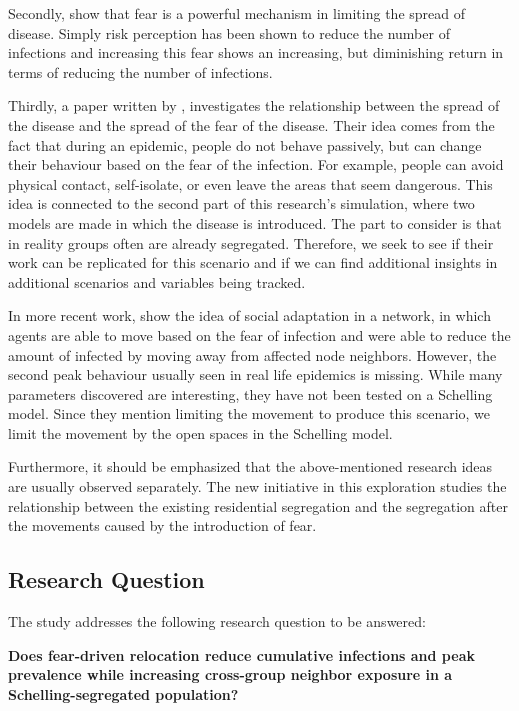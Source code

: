 \documentclass[11pt,a4paper]{article}
\begin{document}
Secondly, \citet{bagnoli2007risk} show that fear is a powerful mechanism in limiting the spread of disease. Simply risk perception has been shown to reduce the number of infections and increasing this fear shows an increasing, but diminishing return in terms of reducing the number of infections.

Thirdly, a paper written by \citet{epstein2008coupled}, investigates the relationship between the spread of the disease and the spread of the fear of the disease. Their idea comes from the fact that during an epidemic, people do not behave passively, but can change their behaviour based on the fear of the infection. For example, people can avoid physical contact, self-isolate, or even leave the areas that seem dangerous. This idea is connected to the second part of this research’s simulation, where two models are made in which the disease is introduced. The part to consider is that in reality groups often are already segregated. Therefore, we seek to see if their work can be replicated for this scenario and if we can find additional insights in additional scenarios and variables being tracked. 

In more recent work, \citet{panicker2024social} show the idea of social adaptation in a network, in which agents are able to move based on the fear of infection and were able to reduce the amount of infected by moving away from affected node neighbors. However, the second peak behaviour usually seen in real life epidemics is missing. While many parameters discovered are interesting, they have not been tested on a Schelling model. Since they mention limiting the movement to produce this scenario, we limit the movement by the open spaces in the Schelling model.

Furthermore, it should be emphasized that the above-mentioned research ideas are usually observed separately. The new initiative in this exploration studies the relationship between the existing residential segregation and the segregation after the movements caused by the introduction of fear.


\subsection{Research Question}
The study addresses the following research question to be answered: 

\textbf{Does fear-driven relocation reduce cumulative infections and peak prevalence while increasing cross-group neighbor exposure in a Schelling-segregated population?}
\end{document}
